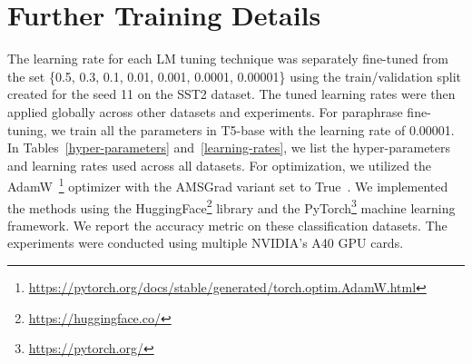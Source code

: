 \documentclass[11pt]{article}
\begin{document}

\section{Further Training Details}
\label{training-details-extra:appendix}

The learning rate for each LM tuning technique was separately fine-tuned from the set \{0.5, 0.3, 0.1, 0.01, 0.001, 0.0001, 0.00001\} using the train/validation split created for the seed 11 on the SST2 dataset. The tuned learning rates were then applied globally across other datasets and experiments. For paraphrase fine-tuning, we train all the parameters in T5-base with the learning rate of 0.00001. In Tables~\ref{hyper-parameters} and~\ref{learning-rates}, we list the hyper-parameters and learning rates used across all datasets.  For optimization, we utilized the AdamW~\cite{DBLP:journals/corr/abs-1711-05101}\footnote{\url{https://pytorch.org/docs/stable/generated/torch.optim.AdamW.html}} optimizer with the AMSGrad variant set to True~\cite{DBLP:journals/corr/abs-1904-09237}. We implemented the methods using the HuggingFace\footnote{\url{https://huggingface.co/}} library and the PyTorch\footnote{\url{https://pytorch.org/}} machine learning framework. We report the accuracy metric on these classification datasets. The experiments were conducted using multiple NVIDIA's A40 GPU cards.
\end{document}
